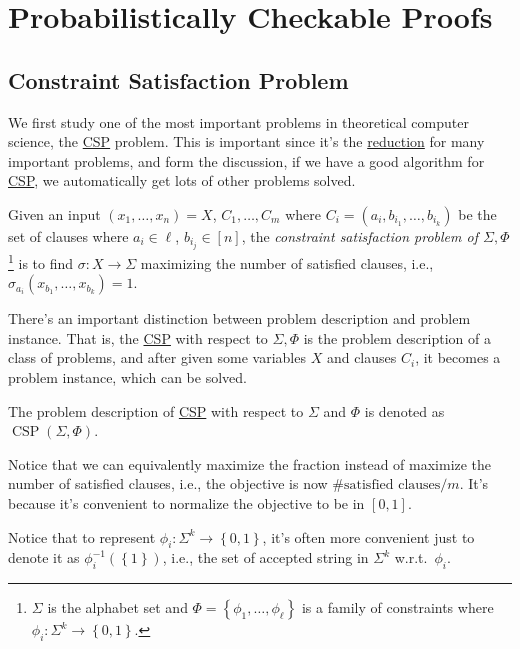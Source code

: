 \section{Probabilistically Checkable Proofs}
\subsection{Constraint Satisfaction Problem}
We first study one of the most important problems in theoretical computer science, the \hyperref[prb:CSP]{CSP} problem. This is important since it's the \hyperref[def:reduction]{reduction} for many important problems, and form the discussion, if we have a good algorithm for \hyperref[prb:CSP]{CSP}, we automatically get lots of other problems solved.

\begin{problem}[CSP]\label{prb:CSP}
Given an input \((x_1, \ldots , x_n) = X\), \(C_1, \ldots  , C_m\) where \(C_i = (a_i, b_{i_1}, \ldots , b_{i_k})\) be the set of clauses where \(a_i\in {\ell }\), \(b_{i_j}\in [n]\), the \emph{constraint satisfaction problem of \(\Sigma, \Phi \)}\footnote{\(\Sigma \) is the alphabet set and \(\Phi = \left\{ \phi _1, \ldots , \phi _{\ell }  \right\} \) is a family of constraints where \(\phi _i \colon \Sigma ^k \to \left\{ 0, 1 \right\} \).} is to find \(\sigma \colon X\to \Sigma \) maximizing the number of satisfied clauses, i.e., \(\sigma _{a_i}(x_{b_1},\ldots , x_{b_k} )=1\).
\end{problem}

There's an important distinction between problem description and problem instance. That is, the \hyperref[prb:CSP]{CSP} with respect to \(\Sigma, \Phi \) is the problem description of a class of problems, and after given some variables \(X\) and clauses \(C_i\), it becomes a problem instance, which can be solved.

\begin{notation}
	The problem description of \hyperref[prb:CSP]{CSP} with respect to \(\Sigma \) and \(\Phi \) is denoted as \(\mathop{\mathrm{CSP}}(\Sigma , \Phi )\).
\end{notation}

Notice that we can equivalently maximize the fraction instead of maximize the number of satisfied clauses, i.e., the objective is now \(\#\text{satisfied clauses} / m \). It's because it's convenient to normalize the objective to be in \([0, 1]\).

\begin{note}
	Notice that to represent \(\phi _i \colon \Sigma ^k \to \left\{ 0, 1 \right\} \), it's often more convenient just to denote it as \(\phi _i ^{-1} (\left\{ 1 \right\} )\), i.e., the set of accepted string in \(\Sigma ^k\) w.r.t.\ \(\phi _i\).
\end{note}

